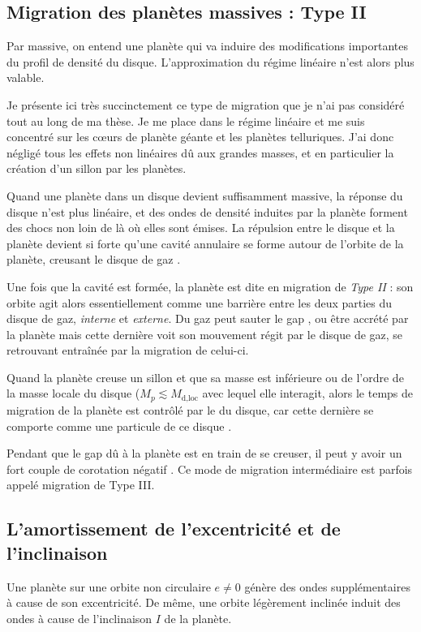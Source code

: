 \subsection{Migration des planètes massives : Type II}
Par massive, on entend une planète qui va induire des modifications importantes du profil de densité du disque. L'approximation du régime linéaire n'est alors plus valable. 

Je présente ici très succinctement ce type de migration que je n'ai pas considéré tout au long de ma thèse. Je me place dans le régime linéaire et me suis concentré sur les cœurs de planète géante et les planètes telluriques. J'ai donc négligé tous les effets non linéaires dû aux grandes masses, et en particulier la création d'un sillon par les planètes.

\bigskip

Quand une planète dans un disque devient suffisamment massive, la réponse du disque n'est plus linéaire, et des ondes de densité induites par la planète forment des chocs non loin de là où elles sont émises. La répulsion entre le disque et la planète devient si forte qu'une cavité annulaire se forme autour de l'orbite de la planète, creusant le disque de gaz \citep{lin1986tidal}.

Une fois que la cavité est formée, la planète est dite en migration de \emph{Type II} : son orbite agit alors essentiellement comme une barrière entre les deux parties du disque de gaz, \emph{interne} et \emph{externe}. Du gaz peut sauter le gap \citep{lubow2006gas}, ou être accrété par la planète mais cette dernière voit son mouvement régit par le disque de gaz, se retrouvant entraînée par la migration de celui-ci.

Quand la planète creuse un sillon et que sa masse est inférieure ou de l'ordre de la masse locale du disque ($M_p \lesssim M_\text{d,loc}$ avec lequel elle interagit, alors le temps de migration de la planète est contrôlé par le  du disque, car cette dernière se comporte comme une particule de ce disque \citep{nelson2000migration}.

\bigskip

Pendant que le gap dû à la planète est en train de se creuser, il peut y avoir un fort couple de corotation négatif \citep{masset2003runaway}. Ce mode de migration intermédiaire est parfois appelé migration de Type III. 

\subsection{L'amortissement de l'excentricité et de l'inclinaison}%
Une planète sur une orbite non circulaire $e\neq 0$ génère des ondes supplémentaires à cause de son excentricité. De même, une orbite légèrement inclinée induit des ondes à cause de l'inclinaison $I$ de la planète. 

